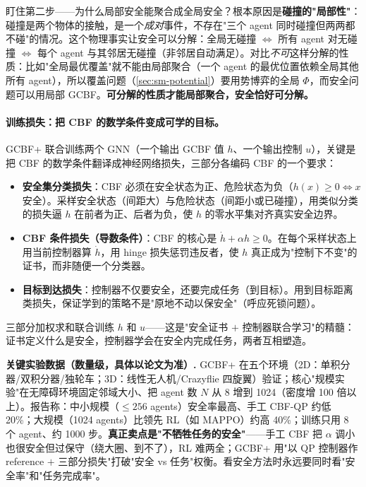 \begin{insight}
盯住第二步——为什么局部安全能聚合成全局安全？根本原因是\textbf{碰撞的"局部性"}：碰撞是两个物体的接触，是一个\emph{成对}事件，不存在"三个 agent 同时碰撞但两两都不碰"的情况。这个物理事实让安全可以分解：全局无碰撞 $\Leftrightarrow$ 所有 agent 对无碰撞 $\Leftrightarrow$ 每个 agent 与其邻居无碰撞（非邻居自动满足）。对比\emph{不可}这样分解的性质：比如"全局最优覆盖"就不能由局部聚合（一个 agent 的最优位置依赖全局其他所有 agent），所以覆盖问题（\cref{sec:sm-potential}）要用势博弈的全局 $\Phi$，而安全问题可以用局部 GCBF。\textbf{可分解的性质才能局部聚合，安全恰好可分解。}
\end{insight}

\paragraph{训练损失：把 CBF 的数学条件变成可学的目标。}
GCBF+ 联合训练两个 GNN（一个输出 GCBF 值 $h$、一个输出控制 $u$），关键是把 CBF 的数学条件翻译成神经网络损失，三部分各编码 CBF 的一个要求\cite{zhang2025gcbfplus}：
\begin{itemize}
  \item \textbf{安全集分类损失}：CBF 必须在安全状态为正、危险状态为负（$h(x)\ge0\Leftrightarrow x$ 安全）。采样安全状态（间距大）与危险状态（间距小或已碰撞），用类似分类的损失逼 $h$ 在前者为正、后者为负，使 $h$ 的零水平集对齐真实安全边界。
  \item \textbf{CBF 条件损失（导数条件）}：CBF 的核心是 $\dot h+\alpha h\ge0$。在每个采样状态上用当前控制器算 $\dot h$，用 hinge 损失惩罚违反者，使 $h$ 真正成为"控制下不变"的证书，而非随便一个分类器。
  \item \textbf{目标到达损失}：控制器不仅要安全，还要完成任务（到目标）。用到目标距离类损失，保证学到的策略不是"原地不动以保安全"（呼应死锁问题）。
\end{itemize}
三部分加权求和联合训练 $h$ 和 $u$——这是"安全证书 $+$ 控制器联合学习"的精髓：证书定义什么是安全，控制器学会在安全内完成任务，两者互相塑造。

\begin{note}
\textbf{关键实验数据（数量级，具体以论文为准）.}\;
GCBF+ 在五个环境（2D：单积分器/双积分器/独轮车；3D：线性无人机/Crazyflie 四旋翼）验证；核心"规模实验"在无障碍环境固定邻域大小、把 agent 数 $N$ 从 8 增到 1024（密度增 100 倍以上）。报告称：中小规模（$\le256$ agents）安全率最高、手工 CBF-QP 约低 20\%；大规模（1024 agents）比领先 RL（如 MAPPO）约高 40\%；训练只用 8 个 agent、约 1000 步。\textbf{真正卖点是"不牺牲任务的安全"}——手工 CBF 把 $\alpha$ 调小也很安全但过保守（绕大圈、到不了），RL 难两全；GCBF+ 用"以 QP 控制器作 reference $+$ 三部分损失"打破"安全 vs 任务"权衡。看安全方法时永远要同时看"安全率"和"任务完成率"。
\end{note}

